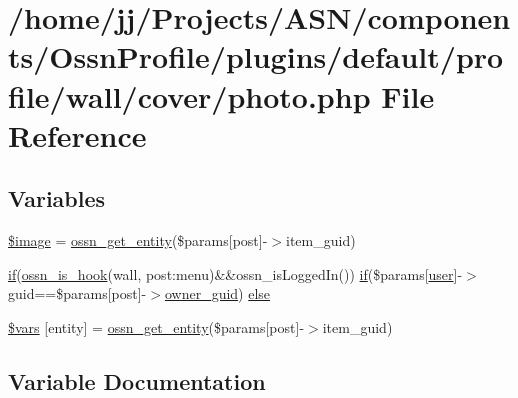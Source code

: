 \hypertarget{cover_2photo_8php}{}\section{/home/jj/\+Projects/\+A\+S\+N/components/\+Ossn\+Profile/plugins/default/profile/wall/cover/photo.php File Reference}
\label{cover_2photo_8php}
\subsection*{Variables}
\begin{DoxyCompactItemize}
\item 
\hyperlink{cover_2photo_8php_aac6146b4cdec66c94263ddb55afd5946}{\$image} = \hyperlink{ossn_8lib_8entities_8php_a6167f40e5a04dc1984990eef4fc7c112}{ossn\+\_\+get\+\_\+entity}(\$params\mbox{[}\textquotesingle{}post\textquotesingle{}\mbox{]}-\/$>$item\+\_\+guid)
\item 
\hyperlink{jquery_8tokeninput_8js_ad8dd46a3cbc004569e34401e9e71771a}{if}(\hyperlink{ossn_8lib_8system_8php_ae29c30c131d7600928d7a2fc28bcd322}{ossn\+\_\+is\+\_\+hook}(\textquotesingle{}wall\textquotesingle{}, \textquotesingle{}post\+:menu\textquotesingle{})\&\&ossn\+\_\+is\+Logged\+In()) \hyperlink{jquery_8tokeninput_8js_ad8dd46a3cbc004569e34401e9e71771a}{if}(\$params\mbox{[}\textquotesingle{}\hyperlink{ossn_8config_8db_8example_8php_a802544b7ba9f79bbf24ef67773d53bed}{user}\textquotesingle{}\mbox{]}-\/$>$guid==\$params\mbox{[}\textquotesingle{}post\textquotesingle{}\mbox{]}-\/$>$\hyperlink{user_8php_a307051fefc937afd02c509c55646f50b}{owner\+\_\+guid}) \hyperlink{cover_2photo_8php_a455b1f9c77db61838a93b44445ad7413}{else}
\item 
\hyperlink{cover_2photo_8php_aa07d093940e8b3330058e9f2c4396426}{\$vars} \mbox{[}\textquotesingle{}entity\textquotesingle{}\mbox{]} = \hyperlink{ossn_8lib_8entities_8php_a6167f40e5a04dc1984990eef4fc7c112}{ossn\+\_\+get\+\_\+entity}(\$params\mbox{[}\textquotesingle{}post\textquotesingle{}\mbox{]}-\/$>$item\+\_\+guid)
\end{DoxyCompactItemize}


\subsection{Variable Documentation}
